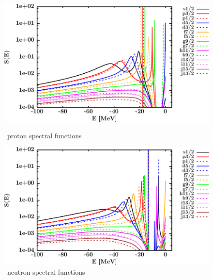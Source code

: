 \begin{figure}[hbtp]
    \centering
    \begin{minipage}{0.42\textwidth}
        \centering
        \includegraphics[width=\textwidth]{figures/sn112_protonSpectralFunctions.png}
        \caption*{\snTwelve\ proton spectral functions}
        \label{DOMFitData_sn112_proton_spectralFunctions}
    \end{minipage}\hspace{6pt}
    \begin{minipage}{0.42\textwidth}
        \centering
        \includegraphics[width=\linewidth]{figures/sn112_neutronSpectralFunctions.png}
        \caption*{\snTwelve\ neutron spectral functions}
        \label{DOMFitData_sn112_neutron_spectralFunctions}
    \end{minipage}
\end{figure}
\afterpage{\clearpage}
